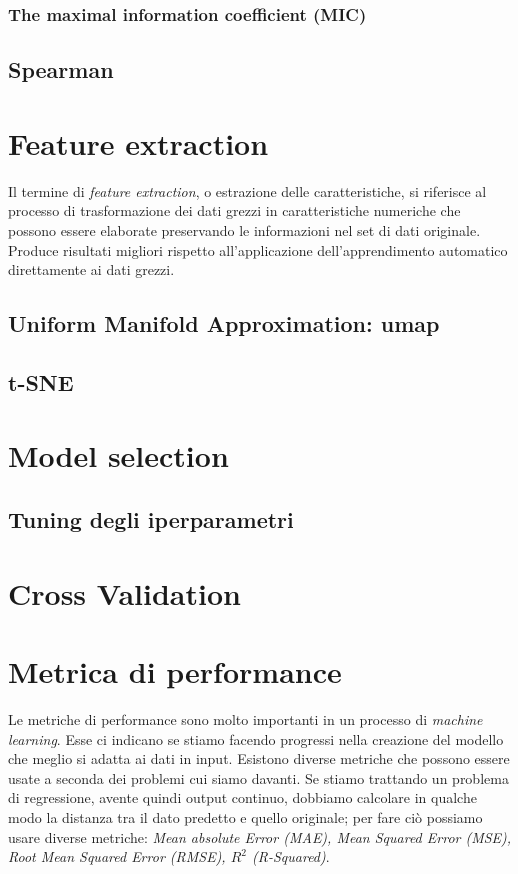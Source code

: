 \documentclass[12pt,italian]{report}
\begin{document}
	\subsubsection{The maximal information coefficient (MIC)}
	\subsection{Spearman}
	
	\section{Feature extraction}
	Il termine di \textit{feature extraction}, o estrazione delle caratteristiche, si riferisce al processo di trasformazione dei dati grezzi in caratteristiche numeriche che possono essere elaborate preservando le informazioni nel set di dati originale. Produce risultati migliori rispetto all'applicazione dell'apprendimento automatico direttamente ai dati grezzi.
	\subsection{Uniform Manifold Approximation: umap}
	\subsection{t-SNE}
	\section{Model selection}
	\subsection{Tuning degli iperparametri}

	\section{Cross Validation}
	
	\section{Metrica di performance}
	\label{Metriche_di_performance}
	Le metriche di performance sono molto importanti in un processo di \textit{machine learning}. Esse ci indicano se stiamo facendo progressi nella creazione del modello che meglio si adatta ai dati in input. Esistono diverse metriche che possono essere usate a seconda dei problemi cui siamo davanti. Se stiamo trattando un problema di regressione, avente quindi output continuo, dobbiamo calcolare in qualche modo la distanza tra il dato predetto e quello originale; per fare ciò possiamo usare diverse metriche: \textit{Mean absolute Error (MAE), Mean Squared Error (MSE), Root Mean Squared Error (RMSE), $R^2$ (R-Squared)}.
	
\end{document}
